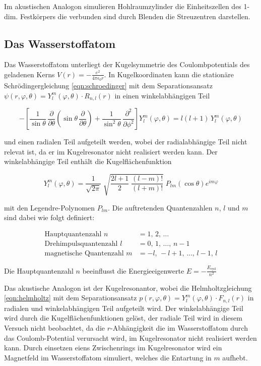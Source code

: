 \noindent
Im akustischen Analogon simulieren Hohlraumzylinder die Einheitszellen des 1-dim. Festkörpers die verbunden sind durch Blenden die Streuzentren darstellen.


\subsection{Das Wasserstoffatom}

\noindent
Das Wasserstoffatom unterliegt der Kugelsymmetrie des Coulombpotentials des geladenen Kerns $V(r) = -\frac{e^2}{4 \pi \epsilon_0 r}$.
In Kugelkoordinaten kann die stationäre Schrödingergleichung \ref{eqn:schroedinger} mit dem Separationsansatz  $\psi(r,\varphi,\theta) = Y^m_l(\varphi,\theta) \cdot R_{n,l}(r)$
in einen winkelabhängigen Teil

\begin{equation*}
    -\left[\frac{1}{\sin \theta} \, \frac{\partial}{\partial \theta} \left(\sin \theta \, \frac{\partial}{\partial \theta}\right) + \frac{1}{\sin^2 \theta} \, \frac{\partial^2}{\partial \phi^2}\right] Y^m_l(\varphi,\theta) = l(l+1) \, Y^m_l(\varphi,\theta)
\end{equation*}

\noindent
und einen radialen Teil aufgeteilt werden, wobei der radialabhängige Teil nicht relevat ist, da er im Kugelresonator nicht realisiert werden kann.
Der winkelabhängige Teil enthält die Kugelflächenfunktion

\begin{equation}
    Y^m_l(\varphi,\theta) = \frac{1}{\sqrt{2\pi}} \; \sqrt{\frac{2l+1}{2} \; \frac{(l-m)!}{(l+m)!}} \; P_{lm}\left(\cos \theta\right) e^{i m \varphi}
\end{equation}

\noindent
mit den Legendre-Polynomen $P_{lm}$.
Die auftretenden Quantenzahlen $n$, $l$ und $m$ sind dabei wie folgt definiert:

\begin{align*}
\text{Hauptquantenzahl  }    n &= 1, \, 2, \, \ldots  \\
\text{Drehimpulsquantenzahl  }    l &= 0, \, 1, \, \ldots, \, n-1 \\
\text{magnetische Quantenzahl  }    m &= -l, \, -l+1, \, \ldots, \, l-1, \, l
\end{align*}

\noindent
Die Hauptquantenzahl $n$ beeinflusst die Energieeigenwerte $E = -\frac{E_{\text{ryd}}}{n^2}$ 

\noindent
Das akustische Analogon ist der Kugelresonantor, wobei die Helmholtzgleichung \ref{eqn:helmholtz} mit dem Separationsansatz  $p(r,\varphi,\theta) = Y^m_l(\varphi,\theta) \cdot F_{n,l}(r)$ in radialen und winkelabhängigen Teil aufgeteilt wird.
Der winkelabhängige Teil wird durch die Kugelflächenfunktionen gelöst, der radiale Teil wird in diesem Versuch nicht beobachtet, da die $r$-Abhängigkeit die im Wasserstoffatom durch das Coulomb-Potential verursacht wird, im Kugelresonator nicht realisiert werden kann.
Durch einsetzen eiens Zwischenrings im Kugelresonator wird ein Magnetfeld im Wasserstoffatom simuliert, welches die Entartung in $m$ aufhebt.

